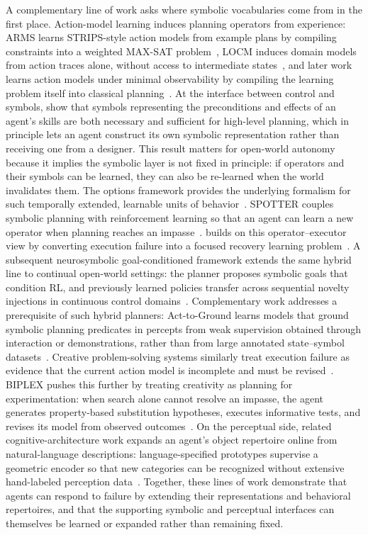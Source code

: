 A complementary line of work asks where symbolic vocabularies come from in the first place.
Action-model learning induces planning operators from experience: ARMS learns STRIPS-style action models from example plans by compiling constraints into a weighted MAX-SAT problem~\citep{yang2007arms}, LOCM induces domain models from action traces alone, without access to intermediate states~\citep{cresswell2013locm}, and later work learns action models under minimal observability by compiling the learning problem itself into classical planning~\citep{aineto2019learning}.
At the interface between control and symbols, \citet{konidaris2018skills} show that symbols representing the preconditions and effects of an agent's skills are both necessary and sufficient for high-level planning, which in principle lets an agent construct its own symbolic representation rather than receiving one from a designer.
This result matters for open-world autonomy because it implies the symbolic layer is not fixed in principle: if operators and their symbols can be learned, they can also be re-learned when the world invalidates them.
The options framework provides the underlying formalism for such temporally extended, learnable units of behavior~\citep{sutton1999options}.
SPOTTER couples symbolic planning with reinforcement learning so that an agent can learn a new operator when planning reaches an impasse~\citep{sarathy2021spotter}.
\RAPidLearn{} builds on this operator--executor view by converting execution failure into a focused recovery learning problem~\citep{goel2022rapidlearn}.
A subsequent neurosymbolic goal-conditioned framework extends the same hybrid line to continual open-world settings: the planner proposes symbolic goals that condition RL, and previously learned policies transfer across sequential novelty injections in continuous control domains~\citep{lorang2024goalconditioned}.
Complementary work addresses a prerequisite of such hybrid planners: Act-to-Ground learns models that ground symbolic planning predicates in percepts from weak supervision obtained through interaction or demonstrations, rather than from large annotated state--symbol datasets~\citep{lymperopoulos2025acttoground}.
Creative problem-solving systems similarly treat execution failure as evidence that the current action model is incomplete and must be revised~\citep{gizzi2019creative,gizzi2022cps}.
BIPLEX pushes this further by treating creativity as planning for experimentation: when search alone cannot resolve an impasse, the agent generates property-based substitution hypotheses, executes informative tests, and revises its model from observed outcomes~\citep{sarathy2022biplex}.
On the perceptual side, related cognitive-architecture work expands an agent's object repertoire online from natural-language descriptions: language-specified prototypes supervise a geometric encoder so that new categories can be recognized without extensive hand-labeled perception data~\citep{schneider2025instruction}.
Together, these lines of work demonstrate that agents can respond to failure by extending their representations and behavioral repertoires, and that the supporting symbolic and perceptual interfaces can themselves be learned or expanded rather than remaining fixed.

